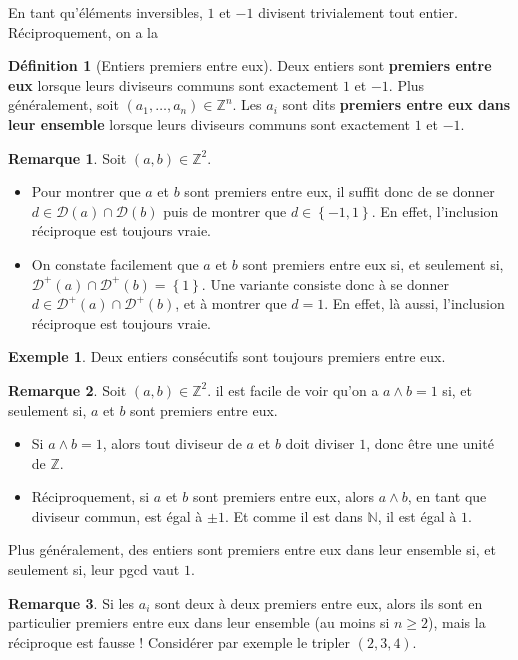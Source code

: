 \documentclass[french]{book}
\newcommand{\N}{\mathbb{N}}
\newcommand{\Z}{\mathbb{Z}}
\theoremstyle{plain}
\theoremstyle{definition}
\newtheorem{dfn}{Définition}[chapter]
\newtheorem{exa}{Exemple}[chapter]
\newtheorem{rmq}{Remarque}[chapter]
\theoremstyle{remark}
\begin{document}
En tant qu'éléments inversibles, $1$ et $-1$ divisent trivialement tout entier. Réciproquement, on a la 
\begin{dfn}[Entiers premiers entre eux]
	Deux entiers sont \textbf{premiers entre eux} lorsque leurs diviseurs communs sont exactement $1$ et $-1$. Plus généralement, soit $(a_1,\ldots,a_n)\in\Z^n$. Les $a_i$ sont dits \textbf{premiers entre eux dans leur ensemble} lorsque leurs diviseurs communs sont exactement $1$ et $-1$.
\end{dfn}
\begin{rmq}
	Soit $(a,b)\in\Z^2$.
	\begin{itemize}
		\item Pour montrer que $a$ et $b$ sont premiers entre eux, il suffit donc de se donner $d\in\mathcal{D}(a)\cap\mathcal{D}(b)$ puis de montrer que $d\in\left\{-1,1\right\}$. En effet, l'inclusion réciproque est toujours vraie.
		\item On constate facilement que $a$ et $b$ sont premiers entre eux si, et seulement si, $\mathcal{D}^+(a)\cap\mathcal{D}^+(b)=\left\{1\right\}$. Une variante consiste donc à se donner $d\in\mathcal{D}^+(a)\cap\mathcal{D}^+(b)$, et à montrer que $d=1$. En effet, là aussi, l'inclusion réciproque est toujours vraie.
	\end{itemize}
\end{rmq}
\begin{exa}
	Deux entiers consécutifs sont toujours premiers entre eux.
\end{exa}
\begin{rmq}
	Soit $(a,b)\in\Z^2$. il est facile de voir qu'on a $a\wedge b=1$ si, et seulement si, $a$ et $b$ sont premiers entre eux.
	\begin{itemize}
		\item Si $a\wedge b=1$, alors tout diviseur de $a$ et $b$ doit diviser $1$, donc être une unité de $\Z$.
		\item Réciproquement, si $a$ et $b$ sont premiers entre eux, alors $a\wedge b$, en tant que diviseur commun, est égal à $\pm1$. Et comme il est dans $\N$, il est égal à $1$.
	\end{itemize}
	Plus généralement, des entiers sont premiers entre eux dans leur ensemble si, et seulement si, leur pgcd vaut $1$.
\end{rmq}
\begin{rmq}
	Si les $a_i$ sont deux à deux premiers entre eux, alors ils sont en particulier premiers entre eux dans leur ensemble (au moins si $n\geqslant2$), mais la réciproque est fausse ! Considérer par exemple le tripler $(2,3,4)$.
\end{rmq}
\end{document}
